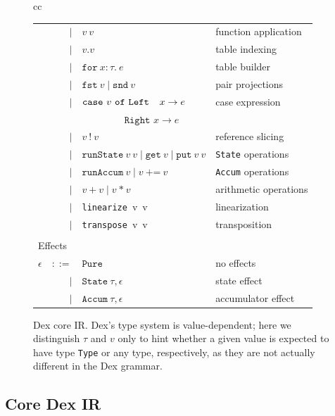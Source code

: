 \documentclass[acmsmall,screen,nonacm]{acmart}
\newcommand{\ttt}[1]{\texttt{#1}}
\newcommand{\forexpr}[3]{\ttt{for}~#1\!:\!#2 .~ #3}
\newcommand{\case}[3]{\ttt{case}~#1~\ttt{of}~
                         \ttt{Left  $x$} \rightarrow #2;~
                         \ttt{Right $x$} \rightarrow #3}
\begin{document}
\begin{figure}[t]
\begin{tabular}{cc}
\begin{tabular}{r@{~}r@{~}ll}
  & $\mid$ & $v~v$                 & function application \\
  & $\mid$ & $v.v$                 & table indexing \\
  & $\mid$ & $\forexpr x \tau e$   & table builder \\
  & $\mid$ & $\ttt{fst}~v \mid \ttt{snd}~v$       & pair projections \\
  & $\mid$ & $\ttt{case}~v~\ttt{of}~
                         \ttt{Left\phantom{-} $x$} \rightarrow e$         & case expression \\
  & & $\phantom{\ttt{case}~v~\ttt{of}~}
                         \ttt{Right $x$} \rightarrow e$         &\\
  & $\mid$ & $v~!~v$               & reference slicing \\
  & $\mid$ & $\ttt{runState}~v~v \mid \ttt{get}~v \mid \ttt{put}~v~v$   & \ttt{State} operations \\
  & $\mid$ & $\ttt{runAccum}~v \mid v~\ttt{+=}~v$   & \ttt{Accum} operations \\
  & $\mid$ & $v~\ttt{+}~v \mid v~\ttt{*}~v$ & arithmetic operations\\
  & $\mid$ & \ttt{linearize}~v~v & linearization \\
  & $\mid$ & \ttt{transpose}~v~v & transposition \\
  \\
  \multicolumn{3}{l}{Effects} \\
  $\epsilon$ & $::=$
             &  $\ttt{Pure}$                & no effects \\
  & $\mid$   &  $\ttt{State}~\tau, \epsilon$   & state       effect \\
  & $\mid$   &  $\ttt{Accum}~\tau, \epsilon$   & accumulator effect \\
\end{tabular}
\end{tabular}
\caption{Dex core IR.  Dex's type system is value-dependent; here we distinguish $\tau$ and $v$ only to hint whether a given value is expected to have type \texttt{Type} or any type, respectively, as they are not actually different in the Dex grammar.
}
\label{fig:core-language-latex}
\end{figure}

\subsection{Core Dex IR}
\label{sec:core-ir}
\end{document}
